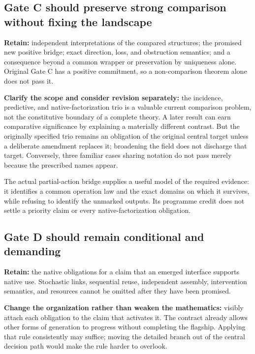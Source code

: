 \documentclass[11pt]{article}
\begin{document}
\subsection{Gate C should preserve strong comparison without fixing the landscape}

\textbf{Retain:} independent interpretations of the compared structures; the promised new positive bridge; exact direction, loss, and obstruction semantics; and a consequence beyond a common wrapper or preservation by uniqueness alone. Original Gate C has a positive commitment, so a non-comparison theorem alone does not pass it.

\textbf{Clarify the scope and consider revision separately:} the incidence, predictive, and native-factorization trio is a valuable current comparison problem, not the constitutive boundary of a complete theory. A later result can earn comparative significance by explaining a materially different contrast. But the originally specified trio remains an obligation of the original central target unless a deliberate amendment replaces it; broadening the field does not discharge that target. Conversely, three familiar cases sharing notation do not pass merely because the prescribed names appear.

The actual partial-action bridge supplies a useful model of the required evidence: it identifies a common operation law and the exact domains on which it survives, while refusing to identify the unmarked outputs. Its programme credit does not settle a priority claim or every native-factorization obligation.

\subsection{Gate D should remain conditional and demanding}

\textbf{Retain:} the native obligations for a claim that an emerged interface supports native use. Stochastic links, sequential reuse, independent assembly, intervention semantics, and resources cannot be omitted after they have been promised.

\textbf{Change the organization rather than weaken the mathematics:} visibly attach each obligation to the claim that activates it. The contract already allows other forms of generation to progress without completing the flagship. Applying that rule consistently may suffice; moving the detailed branch out of the central decision path would make the rule harder to overlook.
\end{document}
